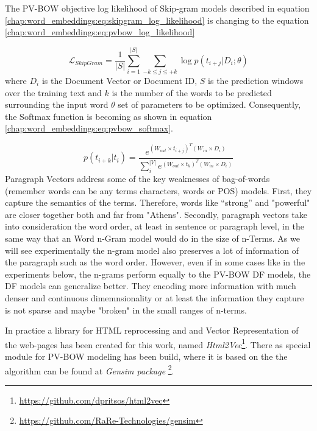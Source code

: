 The PV-BOW objective log likelihood of Skip-gram models described in equation \ref{chap:word_embeddings:eq:skipgram_log_likelihood} is changing to the equation \ref{chap:word_embeddings:eq:pvbow_log_likelihood}  

\begin{equation} \label{chap:word_embeddings:eq:pvbow_log_likelihood}
	 \mathcal{L}_{SkipGram} = \frac{1}{|S|} \sum_{i=1}^{|S|}{ \sum_{-k \leq j \leq +k}{ \log {p(t_{i+j}|D_{i};\theta)}  } }
\end{equation}
\noindent
where $D_{i}$ is the Document Vector or Document ID, $S$ is the prediction windows over the training text and $k$ is the number of the words to be predicted surrounding the input word $\theta$ set of parameters to be optimized. Consequently,  the Softmax function is becoming as shown in equation \ref{chap:word_embeddings:eq:pvbow_softmax}.

\begin{equation} \label{chap:word_embeddings:eq:pvbow_softmax}
	p(t_{i+k}|t_{i}) = \frac{ e^{(W_{out}  \times  t_{i+j})^{T} (W_{in} \times  D_{i})}}{\sum^{|V|}_{i}{ e^{(W_{out}  \times  t_{k})^{T} (W_{in} \times  D_{i})}}} 
\end{equation}
Paragraph Vectors address some of the key weaknesses of bag-of-words (remember words can be any terms characters, words or POS) models. First, they capture the semantics of the terms. Therefore, words like “strong”  and "powerful" are closer together both and far from "Athens". Secondly, paragraph vectors take into consideration the word order, at least in sentence or paragraph level, in the same way that an Word n-Gram model would do in the size of n-Terms. As we will see experimentally the n-gram model also preserves a lot of information of the paragraph such as the word order. However, even if in some cases like in the experiments below, the n-grams perform equally to the PV-BOW DF models, the DF models can generalize better. They encoding more information with much denser and continuous dimemnsionality or at least the information they capture is not sparse and maybe "broken" in the small ranges of n-terms.

In practice a library for HTML reprocessing and and Vector Representation of the web-pages has been created for this work, named  \textit{Html2Vec}\footnote{\url{https://github.com/dpritsos/html2vec}}. There as special module for PV-BOW modeling has been build, where it is based on the the algorithm can be found at \textit{Gensim package} \footnote{\url{https://github.com/RaRe-Technologies/gensim}}. 


